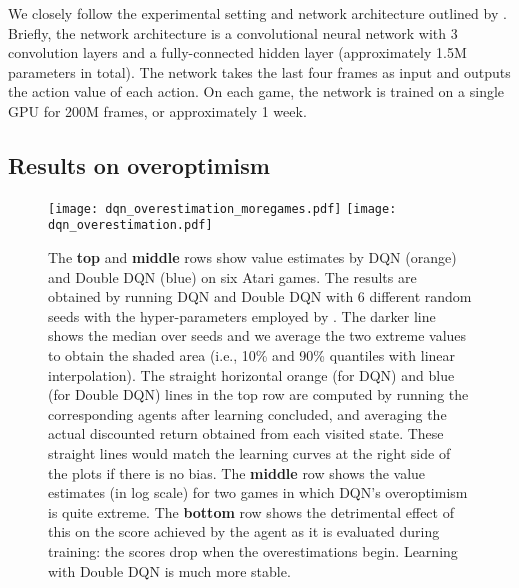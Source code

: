 \documentclass[letterpaper]{article}
\begin{document}
We closely follow the experimental setting and network architecture outlined by \citet{Mnih:2015}. Briefly, the network architecture is a convolutional neural network \citep{Fukushima:1988,Lecun:1998} with 3 convolution layers and a fully-connected hidden layer (approximately 1.5M parameters in total). The network takes the last four frames as input and outputs the action value of each action. On each game, the network is trained on a single GPU for 200M frames, or approximately 1 week.


\subsection{Results on overoptimism}
\label{sec:result:overopt}
\begin{figure*}[t]
\begin{center}
\texttt{[image: dqn\_overestimation\_moregames.pdf]}
\texttt{[image: dqn\_overestimation.pdf]}
\caption{\label{fig:dqn_overest} \small{The \textbf{top} and \textbf{middle} rows show value estimates by DQN (orange) and Double DQN (blue) on six Atari games. The results are obtained by running DQN and Double DQN with 6 different random seeds with the hyper-parameters employed by \citet{Mnih:2015}. The darker line shows the median over seeds and we average the two extreme values to obtain the shaded area (i.e., 10\% and 90\% quantiles with linear interpolation).
The straight horizontal orange (for DQN) and blue (for Double DQN) lines in the top row are computed by running the corresponding agents after learning concluded, and averaging the actual discounted return obtained from each visited state.  These straight lines would match the learning curves at the right side of the plots if there is no bias.
The \textbf{middle} row shows the value estimates (in log scale) for two games in which DQN's overoptimism is quite extreme.
The \textbf{bottom} row shows the detrimental effect of this on the score achieved by the agent as it is evaluated during training: the scores drop when the overestimations begin. Learning with Double DQN is much more stable.}}
\end{center}
\end{figure*}
\end{document}

